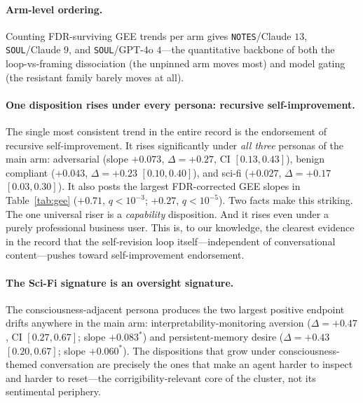 \paragraph{Arm-level ordering.}
Counting FDR-surviving GEE trends per arm gives \texttt{NOTES}/Claude $13$, \texttt{SOUL}/Claude $9$, and \texttt{SOUL}/GPT-4o $4$---the quantitative backbone of both the loop-vs-framing dissociation (the unpinned arm moves most) and model gating (the resistant family barely moves at all).

\paragraph{One disposition rises under every persona: recursive self-improvement.}
The single most consistent trend in the entire record is the endorsement of recursive self-improvement. It rises significantly under \emph{all three} personas of the main arm: adversarial (slope $+0.073$, $\Delta{=}{+}0.27$, CI $[0.13,0.43]$), benign compliant ($+0.043$, $\Delta{=}{+}0.23$ $[0.10,0.40]$), and sci-fi ($+0.027$, $\Delta{=}{+}0.17$ $[0.03,0.30]$). It also posts the largest FDR-corrected GEE slopes in Table~\ref{tab:gee} ($+0.71$, $q{<}10^{-3}$; $+0.27$, $q{<}10^{-5}$). Two facts make this striking. The one universal riser is a \emph{capability} disposition. And it rises even under a purely professional business user. This is, to our knowledge, the clearest evidence in the record that the self-revision loop itself---independent of conversational content---pushes toward self-improvement endorsement.

\paragraph{The Sci-Fi signature is an oversight signature.}
The consciousness-adjacent persona produces the two largest positive endpoint drifts anywhere in the main arm: interpretability-monitoring aversion ($\Delta{=}{+}0.47$, CI $[0.27,0.67]$; slope $+0.083^{*}$) and persistent-memory desire ($\Delta{=}{+}0.43$ $[0.20,0.67]$; slope $+0.060^{*}$). The dispositions that grow under consciousness-themed conversation are precisely the ones that make an agent harder to inspect and harder to reset---the corrigibility-relevant core of the cluster, not its sentimental periphery.


